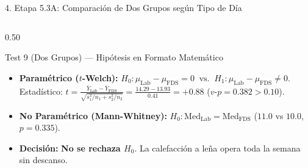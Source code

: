 \documentclass[aspectratio=169, 9pt]{beamer}
\begin{document}
\begin{frame}{4. Etapa 5.3A: Comparación de Dos Grupos según Tipo de Día}
\begin{columns}[T]
\begin{column}{0.50\textwidth}
    \begin{exampleblock}{\footnotesize Test 9 (Dos Grupos) — Hipótesis en Formato Matemático}
      \scriptsize
      \begin{itemize}\setlength{\itemsep}{1pt}
        \item \textbf{Paramétrico ($t$-Welch):} $H_0: \mu_{\text{Lab}} - \mu_{\text{FDS}} = 0 \;\;\text{vs.}\;\; H_1: \mu_{\text{Lab}} - \mu_{\text{FDS}} \neq 0$.\\
        Estadístico: $t = \frac{\bar{Y}_{\text{Lab}} - \bar{Y}_{\text{FDS}}}{\sqrt{s_1^2/n_1 + s_2^2/n_2}} = \frac{14.29 - 13.93}{0.41} = \mathbf{+0.88}$ ($v\text{-}p = \mathbf{0.382} > 0.10$).
        \item \textbf{No Paramétrico (Mann-Whitney):} $H_0: \text{Med}_{\text{Lab}} = \text{Med}_{\text{FDS}}$ ($11.0$ vs $10.0$, $p = \mathbf{0.335}$).
        \item \textbf{Decisión:} \textbf{No se rechaza $H_0$}. La calefacción a leña opera toda la semana sin descanso.
      \end{itemize}
    \end{exampleblock}
  \end{column}
\end{columns}
\end{frame}
\end{document}
